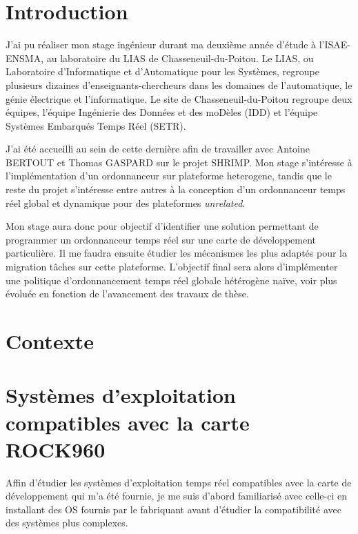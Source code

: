 \documentclass{article}
\begin{document}

    \newpage
    \thispagestyle{empty}
    \mbox{}
    \newpage
    
    \section{Introduction}

    
    J'ai pu réaliser mon stage ingénieur durant ma deuxième année d'étude à l'ISAE-ENSMA, au laboratoire du LIAS de Chasseneuil-du-Poitou. Le LIAS, ou Laboratoire d'Informatique et d'Automatique pour les Systèmes, regroupe plusieurs dizaines d'enseignants-chercheurs dans les domaines de l'automatique, le génie électrique et l'informatique. Le site de Chasseneuil-du-Poitou regroupe deux équipes, l'équipe Ingénierie des Données et des moDèles (IDD) et l'équipe Systèmes Embarqués Temps Réel (SETR). 

    J'ai été accueilli au sein de cette dernière afin de travailler avec \color{red} Antoine BERTOUT et Thomas GASPARD \color{black} sur le projet \gls{SHRIMP}. Mon stage s'intéresse à l'implémentation d'un \gls{ordonnanceur} sur \gls{plateforme heterogene}\cite{bertout2020workload}, tandis que le reste du projet s'intéresse entre autres à la conception d'un \gls{ordonnanceur} temps réel global et dynamique pour des plateformes \textit{unrelated}.

    Mon stage aura donc pour objectif d'identifier une solution permettant de programmer un \gls{ordonnanceur} temps réel sur une carte de développement particulière. Il me faudra ensuite étudier les mécanismes les plus adaptés pour la migration tâches sur cette plateforme. L'objectif final sera alors d'implémenter une politique d'\gls{ordonnancement} temps réel globale hétérogène naïve, voir plus évoluée en fonction de l'avancement des travaux de thèse.
    
    \newpage
    \section{Contexte}
    
    


    \newpage
    \section[OS compatibles avec la carte]{Systèmes d'exploitation compatibles avec la carte ROCK960}

    Affin d'étudier les systèmes d'exploitation temps réel compatibles avec la carte de développement qui m'a été fournie, je me suis d'abord familiarisé avec celle-ci en installant des OS fournis par le fabriquant avant d'étudier la compatibilité avec des systèmes plus complexes.
\end{document}
